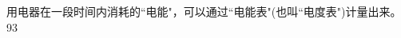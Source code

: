 \documentclass[UTF8]{ctexart}
\begin{document}
用电器在一段时间内消耗的``电能"，可以通过``电能表"(也叫``电度表")计量出来。\\








	
	93
	
	
	
	
	
	
	
	
	
	
	
	
	
	
	
	
	
	
	
	
		

	


	
	
	
	
	
	
	
	
	
	
	
	
\end{document}
